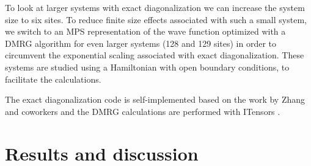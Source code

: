 \documentclass[twoside,twocolumn,9pt]{article}
\begin{document}
To look at larger systems with exact diagonalization we can increase the system size to six sites. To reduce finite size effects associated with such a small system, we switch to an MPS representation of the wave function optimized with a DMRG algorithm for even larger systems (128 and 129 sites) in order to circumvent the exponential scaling associated with exact diagonalization. These systems are studied using a Hamiltonian with open boundary conditions, to facilitate the calculations.

The exact diagonalization code is self-implemented \cite{github} based on the work by Zhang and coworkers \cite{zhang2010} and the DMRG calculations are performed with ITensors \cite{Fishman2022}.

\section{Results and discussion}
\end{document}
